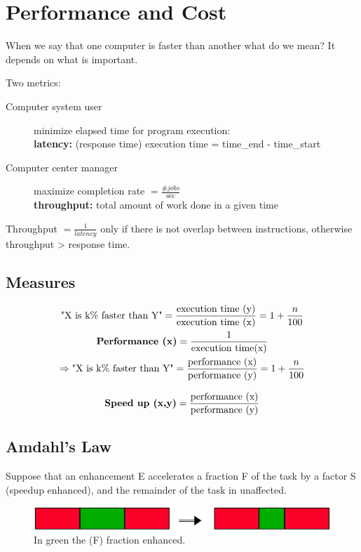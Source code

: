 
\section{Performance and Cost}\label{sec:performance-and-cost}
When we say that one computer is faster than another what do we mean?
It depends on what is important.

Two metrics:
\begin{description}
    \item[Computer system user] minimize elapsed time for program execution:\\
    \textbf{latency:} (response time) execution time = time\_end - time\_start
    \item[Computer center manager] maximize completion rate \(=\frac{\#jobs}{\sec}\)\\
    \textbf{throughput:} total amount of work done in a given time
\end{description}
Throughput \(= \frac{1}{latency}\) only if there is not overlap between instructions, otherwise throughput >
response time.

\subsection{Measures}\label{subsec:measures}
\begin{gather*}
    \text{"X is k\% faster than Y"} = \frac{\text{execution time (y)}}{\text{execution time (x)}} = 1 + \frac{n}{100}\\
    \text{\textbf{Performance (x)}} = \frac{1}{\text{execution time(x)}}\\
    \Rightarrow \text{"X is k\% faster than Y"} = \frac{\text{performance (x)}}{\text{performance (y)}} = 1 +
\frac{n}{100}\\
\end{gather*}

\[\text{\textbf{Speed up (x,y)}} = \frac{\text{performance (x)}}{\text{performance (y)}}\]

\subsection{Amdahl's Law}\label{subsec:amdahl's-law}
Suppose that an enhancement E accelerates a fraction F of the task by a factor S (speedup enhanced), and the remainder
of the task in unaffected.

\begin{figure}[H]
    \centering
    \includegraphics[scale = 0.3]{images/amdahls-law}
    \caption{In green the (F) fraction enhanced.}
    \label{fig:amdalhs-law}
\end{figure}

